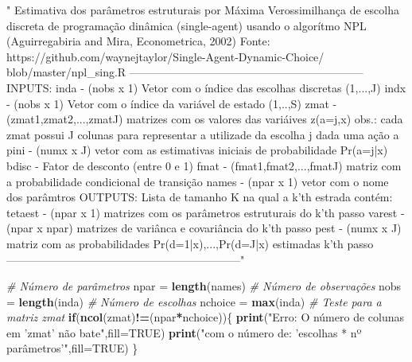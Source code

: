 \documentclass[12pt,a4paper]{article}
\newenvironment{Shaded}{\begin{snugshade}}{\end{snugshade}}
\newcommand{\CommentTok}[1]{\textcolor[rgb]{0.56,0.35,0.01}{\textit{#1}}}
\newcommand{\ControlFlowTok}[1]{\textcolor[rgb]{0.13,0.29,0.53}{\textbf{#1}}}
\newcommand{\DataTypeTok}[1]{\textcolor[rgb]{0.13,0.29,0.53}{#1}}
\newcommand{\KeywordTok}[1]{\textcolor[rgb]{0.13,0.29,0.53}{\textbf{#1}}}
\newcommand{\NormalTok}[1]{#1}
\newcommand{\OperatorTok}[1]{\textcolor[rgb]{0.81,0.36,0.00}{\textbf{#1}}}
\newcommand{\OtherTok}[1]{\textcolor[rgb]{0.56,0.35,0.01}{#1}}
\newcommand{\StringTok}[1]{\textcolor[rgb]{0.31,0.60,0.02}{#1}}
\begin{document}
\begin{Shaded}
\begin{Highlighting}[]
{{{{{{{{{  \StringTok{"}
\StringTok{  Estimativa dos parâmetros estruturais por Máxima Verossimilhança }
\StringTok{  de escolha discreta de programação dinâmica (single-agent)}
\StringTok{  usando o algorítmo NPL (Aguirregabiria and Mira, Econometrica, 2002)}
\StringTok{  }
\StringTok{  Fonte: https://github.com/waynejtaylor/Single-Agent-Dynamic-Choice/}
\StringTok{  blob/master/npl_sing.R }
\StringTok{   }
\StringTok{  ---------------------------------------------------------------}
\StringTok{  }
\StringTok{  INPUTS:}
\StringTok{    inda    - (nobs x 1) Vetor com o índice das escolhas }
\StringTok{    discretas (1,...,J)}
\StringTok{  }
\StringTok{    indx    - (nobs x 1) Vetor com o índice da variável }
\StringTok{    de estado (1,..,S)}
\StringTok{  }
\StringTok{    zmat    - (zmat1,zmat2,...,zmatJ) matrizes com os }
\StringTok{    valores das variáives}
\StringTok{              z(a=j,x)}
\StringTok{            obs.: cada zmat possui J colunas}
\StringTok{            para representar a utilizade da escolha j}
\StringTok{            dada uma ação a}
\StringTok{  }
\StringTok{    pini    - (numx x J) vetor com as }
\StringTok{    estimativas iniciais de probabilidade Pr(a=j|x)}
\StringTok{  }
\StringTok{    bdisc   - Fator de desconto (entre 0 e 1)}
\StringTok{  }
\StringTok{    fmat    - (fmat1,fmat2,...,fmatJ) matriz com}
\StringTok{    a probabilidade condicional de transição}
\StringTok{  }
\StringTok{    names   - (npar x 1) vetor com o nome dos parâmtros}
\StringTok{  }
\StringTok{   OUTPUTS:}
\StringTok{    Lista de tamanho K na qual a k'th estrada contém:}
\StringTok{    }
\StringTok{    tetaest - (npar x 1) matrizes com os parâmetros estruturais }
\StringTok{    do k'th passo}
\StringTok{  }
\StringTok{    varest  - (npar x npar) matrizes de variânca e covariância }
\StringTok{    do k'th passo}
\StringTok{  }
\StringTok{    pest    - (numx x J) matriz com as probabilidades}
\StringTok{    Pr(d=1|x),...,Pr(d=J|x) estimadas k'th passo}
\StringTok{  ---------------------------------------------------------------"}
  
  \CommentTok{# Número de parâmetros}
\NormalTok{  npar =}\StringTok{ }\KeywordTok{length}\NormalTok{(names)}
  \CommentTok{# Número de observações}
\NormalTok{  nobs =}\StringTok{ }\KeywordTok{length}\NormalTok{(inda)}
  \CommentTok{# Número de escolhas}
\NormalTok{  nchoice =}\StringTok{ }\KeywordTok{max}\NormalTok{(inda)}
  \CommentTok{# Teste para a matriz zmat}
  \ControlFlowTok{if}\NormalTok{(}\KeywordTok{ncol}\NormalTok{(zmat)}\OperatorTok{!=}\NormalTok{(npar}\OperatorTok{*}\NormalTok{nchoice))\{}
    \KeywordTok{print}\NormalTok{(}\StringTok{"Erro: O número de colunas em 'zmat' não bate"}\NormalTok{,}\DataTypeTok{fill=}\OtherTok{TRUE}\NormalTok{)}
    \KeywordTok{print}\NormalTok{(}\StringTok{"com o número de: 'escolhas * nº parâmetros'"}\NormalTok{,}\DataTypeTok{fill=}\OtherTok{TRUE}\NormalTok{)}
\NormalTok{  \}}
  
}}}}}}}}}
\end{Highlighting}
\end{Shaded}
\end{document}

